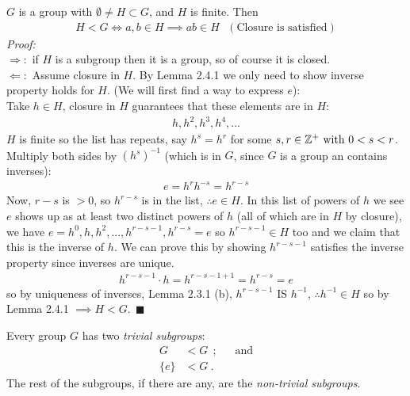 \begin{lemma}
$G$ is a group with $\emptyset\neq H\subset G$, and $H$ is finite. Then
\begin{align}
    H<G \iff a,b\in H \implies ab\in H \ \ \ (\text{Closure is satisfied})\nonumber
\end{align}
\textit{Proof:}\\
$\Rightarrow :$ if $H$ is a subgroup then it is a group, so of course it is closed.\\
$\Leftarrow :$ Assume closure in $H$. By Lemma 2.4.1 we only need to show inverse property holds for $H$. (We will first find a way to express $e$):\\ 
\noindent Take $h\in H$, closure in $H$ guarantees that these elements are in $H$:
\begin{align}
    h,h^2,h^3,h^4,...\nonumber
\end{align}
$H$ is finite so the list has repeats, say $h^s=h^r$ for some $s,r\in {\mathbb{ Z}}^+ \text{ with } 0<s<r$. Multiply both sides by $(h^s)^{-1}$ (which is in $G$, since $G$ is a group an contains inverses):
\begin{align}
    e=h^rh^{-s}=h^{r-s} \nonumber
\end{align}
Now, $r-s$ is $>0$, so $h^{r-s}$ is in the list, $\therefore e\in H$. In this list of powers of $h$ we see $e$ shows up as at least two distinct powers of $h$ (all of which are in $H$ by closure), we have $e=h^0,h,h^2,...,h^{r-s-1},h^{r-s}=e$ so $h^{r-s-1}\in H$ too and we claim that this is the inverse of $h$. We can prove this by showing $h^{r-s-1}$ satisfies the inverse property since inverses are unique.
\begin{align}
    h^{r-s-1}\cdot h= h^{r-s-1+1}=h^{r-s}=e \nonumber
\end{align}
so by uniqueness of inverses, Lemma 2.3.1 (b), $h^{r-s-1}$ IS $h^{-1}$, $\therefore h^{-1}\in H$ so by Lemma 2.4.1 $\implies H<G. \ \ \blacksquare$
\end{lemma}

\begin{example}
Every group $G$ has two \textit{trivial subgroups}:
\begin{align}
    G&<G   \ \ ; \ \ \ \ \ \ \ \text{and} \nonumber\\
    \{e\}&<G \ . \nonumber
\end{align}
The rest of the subgroups, if there are any, are the \textit{non-trivial subgroups}.
\end{example}

